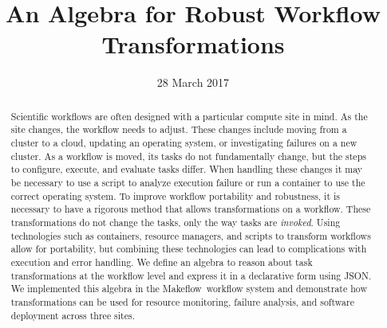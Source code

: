 \documentclass[conference]{IEEEtran}
\newcommand{\mf}{Makeflow\ }
\begin{document}
\title{An Algebra for Robust Workflow Transformations}

\author{
}
\author{
\and
{}
}

\date{28 March 2017}


\maketitle

\begin{abstract}
Scientific workflows 
are often designed with a
particular compute site in mind.
As the site changes,
the workflow needs to adjust.
These changes include 
moving from a cluster to a cloud,
updating an operating system,
or investigating failures on a new cluster.
As a workflow is moved, 
its tasks do not fundamentally change,
but the steps to configure, 
execute, and evaluate tasks differ.
When handling these changes it may be necessary
to use a script to analyze execution failure or
run a container to use the correct operating system.
To improve workflow portability and robustness,
it is necessary to have
a rigorous method that allows transformations on a workflow.
These transformations do not change the tasks, 
only the way tasks are \emph{invoked}.
Using technologies such as containers, resource managers, and scripts 
to transform workflows allow for portability,
but combining these technologies
can lead to complications with execution and error
handling.
We define an algebra to reason about task transformations 
at the workflow level and express it
in a declarative form using JSON.
We implemented this algebra in the
\mf workflow system and demonstrate
how transformations can be used for 
resource monitoring, failure analysis, and software deployment across three sites.
\end{abstract}
\end{document}
